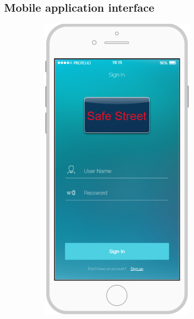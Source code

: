 \documentclass{article}
\begin{document}
	\subsection{Mobile application interface}
		\begin{figure}[H]
			\centering
			\begin{subfigure}[H]{0.49\linewidth}
				\includegraphics[width=\linewidth]{images/Sign_In.png}

\end{subfigure}
\end{figure}
\end{document}
